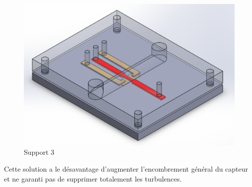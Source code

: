 \begin{figure}[H]
    \centering
    \includegraphics[scale = 0.3]{images/Design4}
    \caption{Support 3}
    \label{fig:solution3}
\end{figure}
Cette solution a le désavantage d'augmenter l'encombrement général du capteur et ne garanti pas de supprimer totalement les turbulences. 

